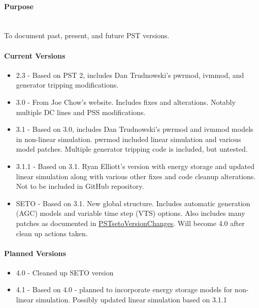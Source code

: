 \documentclass[12pt]{article}
\begin{document}
\onehalfspacing
\raggedright
\paragraph{Purpose} \ \\
To document past, present, and future PST versions.

\paragraph{Current Versions}
\begin{itemize}
\item 2.3 - Based on PST 2, includes Dan Trudnowski's pwrmod, ivmmod, and generator tripping modifications.
\item 3.0 - From Joe Chow's website. 
Includes fixes and alterations. 
Notably multiple DC lines and PSS modifications.
\item 3.1 - Based on 3.0, includes Dan Trudnowski's pwrmod and ivmmod models in non-linear simulation. 
pwrmod included linear simulation and various model patches. 
Multiple generator tripping code is included, but untested.
\item 3.1.1 - Based on 3.1. Ryan Elliott's version with energy storage and updated linear simulation along with various other fixes and code cleanup alterations. 
Not to be included in GitHub repository.
\item SETO - Based on 3.1. New global structure. 
Includes automatic generation (AGC) models and variable time step (VTS) options. 
Also includes many patches as documented in 
\href{https://github.com/thadhaines/MT-Tech-SETO/tree/master/researchDocs/TEX/one-offs/200709-PSTsetoVersionChanges}{PSTsetoVersionChanges}. 
% 
Will become 4.0 after clean up actions taken.
\end{itemize}

\paragraph{Planned Versions}
\begin{itemize}
\item 4.0 - Cleaned up SETO version 
\item 4.1 - Based on 4.0 - planned to incorporate energy storage models for non-linear simulation. Possibly updated linear simulation based on 3.1.1
\end{itemize}
\end{document}
